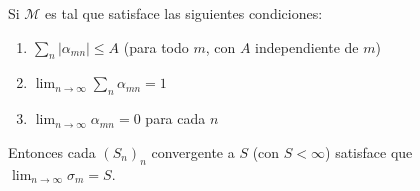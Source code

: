 \begin{teo}
    Si $\mathcal{M}$ es tal que satisface las siguientes condiciones:

    \begin{enumerate}
        \item $\sum_{n} |\alpha_{mn}| \leq A$ (para todo $m$, con $A$ independiente de $m$)
        \item $\lim_{n \to \infty} \sum_{n} \alpha_{mn} = 1$
        \item $\lim_{n \to \infty} \alpha_{mn} = 0$ para cada $n$
    \end{enumerate}

    Entonces cada $(S_n)_n$ convergente a $S$ (con $S < \infty$) satisface que $\lim_{n \to \infty} \sigma_m = S$.
\end{teo}

